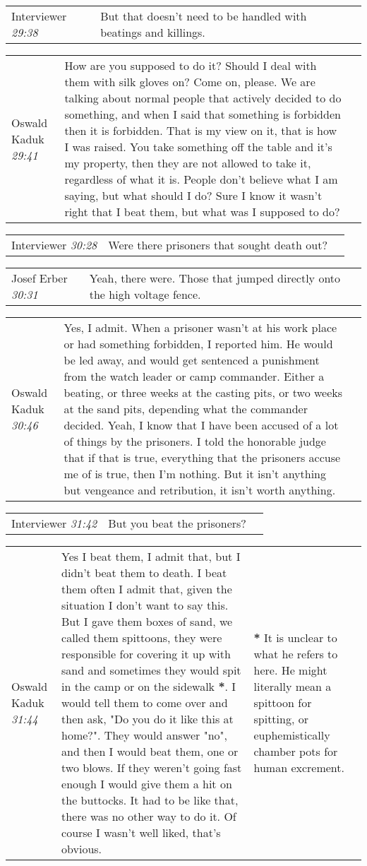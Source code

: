 \documentclass{article}
\newcommand{\I}{Interviewer}
\newcommand{\OK}{Oswald Kaduk}
\newcommand{\JE}{Josef Erber}
\newcommand{\dialogueentry}[4]{
    \begin{center}
    \begin{tabular}{p{1in} p{3.5in} p{1.5in}} 
        #2 \newline \textit{#1} & #3 & \small{#4} 
    \end{tabular}
    \end{center}
}
\newcommand{\seenote}[1]{\textbf{#1}}
\newcommand{\twolinebreak}{\newline \newline}
\begin{document}
\dialogueentry{29:38}{\I}{But that doesn't need to be  handled with beatings and killings.}{}

\dialogueentry{29:41}{\OK}{How are you supposed to do it? Should I deal with them with silk gloves on? Come on, please. We are talking about normal people that actively decided to do something, and when I said that something is forbidden then it is forbidden. 
\twolinebreak
That is my view on it, that is how I was raised. You take something off the table and it's my property, then they are not allowed to take it, regardless of what it is. People don't believe what I am saying, but what should I do? Sure I know it wasn't right that I beat them, but what was I supposed to do?}{}

\dialogueentry{30:28}{\I}{Were there prisoners that sought death out?}{}

\dialogueentry{30:31}{\JE}{Yeah, there were. Those that jumped directly onto the high voltage fence.}{}

\dialogueentry{30:46}{\OK}{Yes, I admit. When a prisoner wasn't at his work place or had something forbidden, I reported him. He would be led away, and would get sentenced a punishment from the watch leader or camp commander. Either a beating, or three weeks at the casting pits, or two weeks at the sand pits, depending what the commander decided. 
\twolinebreak
Yeah, I know that I have been accused of a lot of things by the prisoners. I told the honorable judge that if that is true, everything that the prisoners accuse me of is true, then I'm nothing. But it isn't anything but vengeance and retribution, it isn't worth anything.}{}

\dialogueentry{31:42}{\I}{But you beat the prisoners?}{}

\dialogueentry{31:44}{\OK}{Yes I beat them, I admit that, but I didn't beat them to death. I beat them often I admit that, given the situation I don't want to say this. But I gave them boxes of sand, we called them spittoons, they were responsible for covering it up with sand and sometimes they would spit in the camp or on the sidewalk \seenote{*}.
\twolinebreak
I would tell them to come over and then ask, "Do you do it like this at home?". They would answer "no", and then I would beat them, one or two blows. If they weren't going fast enough I would give them a hit on the buttocks. It had to be like that, there was no other way to do it. Of course I wasn't well liked, that's obvious.}{\seenote{*} It is unclear to what he refers to here. He might literally mean a spittoon for spitting, or euphemistically chamber pots for human excrement.}
\end{document}
